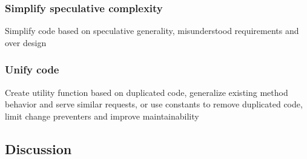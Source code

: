 \subsubsection*{Simplify speculative complexity}
Simplify code based on speculative generality, misunderstood requirements and over design

\subsubsection*{Unify code}
Create utility function based on duplicated code, generalize existing method behavior and serve similar requests, or use constants to remove duplicated code, limit change preventers and improve maintainability

\subsection{Discussion}